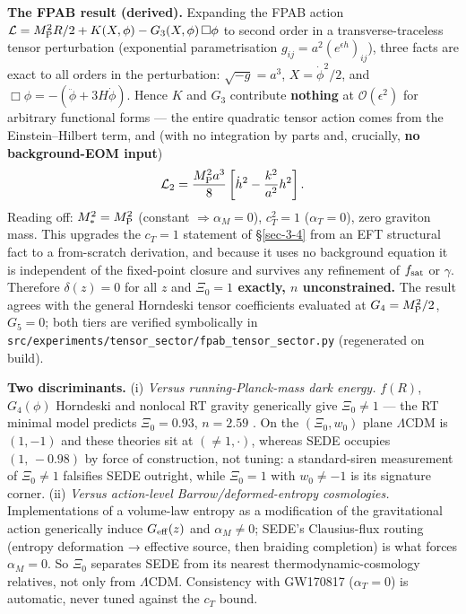 \documentclass[preprint,12pt]{elsarticle}
\begin{document}
\textbf{The FPAB result (derived).} Expanding the FPAB action
\(\mathcal{L} = M_{\rm P}^2 R/2 + K(X,\phi) - G_3(X,\phi)\,\Box\phi\) to
second order in a transverse-traceless tensor perturbation (exponential
parametrisation \(g_{ij} = a^2(e^{\epsilon h})_{ij}\)), three facts are
exact to all orders in the perturbation: \(\sqrt{-g} = a^3\),
\(X = \dot\phi^2/2\), and \(\Box\phi = -(\ddot\phi + 3H\dot\phi)\).
Hence \(K\) and \(G_3\) contribute \textbf{nothing} at
\(\mathcal{O}(\epsilon^2)\) for arbitrary functional forms --- the
entire quadratic tensor action comes from the Einstein--Hilbert term,
and (with no integration by parts and, crucially, \textbf{no
background-EOM input})
\begin{equation}\mathcal{L}_2 = \frac{M_{\rm P}^2 a^3}{8}\left[\dot h^2 - \frac{k^2}{a^2}h^2\right].\end{equation}
Reading off: \(M_*^2 = M_{\rm P}^2\) (constant
\(\Rightarrow \alpha_M = 0\)), \(c_T^2 = 1\) (\(\alpha_T = 0\)), zero
graviton mass. This upgrades the \(c_T = 1\) statement of §\ref{sec-3-4}
from an EFT structural fact to a from-scratch derivation, and because it
uses no background equation it is independent of the fixed-point closure
and survives any refinement of \(f_{\rm sat}\) or \(\gamma\). Therefore
\(\delta(z) = 0\) for all \(z\) and \textbf{\(\Xi_0 = 1\) exactly, \(n\)
unconstrained.} The result agrees with the general Horndeski tensor
coefficients \citep{Bellini:2014fua} evaluated at
\(G_4 = M_{\rm P}^2/2\), \(G_5 = 0\); both tiers are verified
symbolically in
\texttt{src/\allowbreak experiments/\allowbreak tensor\_\allowbreak sector/\allowbreak fpab\_\allowbreak tensor\_\allowbreak sector.\allowbreak py}
(regenerated on build).

\textbf{Two discriminants.} (i) \emph{Versus running-Planck-mass dark
energy.} \(f(R)\), \(G_4(\phi)\) Horndeski and nonlocal RT gravity
generically give \(\Xi_0 \neq 1\) --- the RT minimal model predicts
\(\Xi_0 = 0.93\), \(n = 2.59\) \citep{Belgacem:2019nonlocal}. On the
\((\Xi_0, w_0)\) plane \(\Lambda\)CDM is \((1,-1)\) and these theories
sit at \((\neq 1, \cdot)\), whereas SEDE occupies \((1,\,-0.98)\) by
force of construction, not tuning: a standard-siren measurement of
\(\Xi_0 \neq 1\) falsifies SEDE outright, while \(\Xi_0 = 1\) with
\(w_0 \neq -1\) is its signature corner. (ii) \emph{Versus action-level
Barrow/deformed-entropy cosmologies.} Implementations of a volume-law
entropy as a modification of the gravitational action generically induce
\(G_{\rm eff}(z)\) and \(\alpha_M \neq 0\); SEDE's Clausius-flux routing
(entropy deformation → effective source, then braiding completion) is
what forces \(\alpha_M = 0\). So \(\Xi_0\) separates SEDE from its
nearest thermodynamic-cosmology relatives, not only from \(\Lambda\)CDM.
Consistency with GW170817 (\(\alpha_T = 0\)) is automatic, never tuned
against the \(c_T\) bound.
\end{document}
